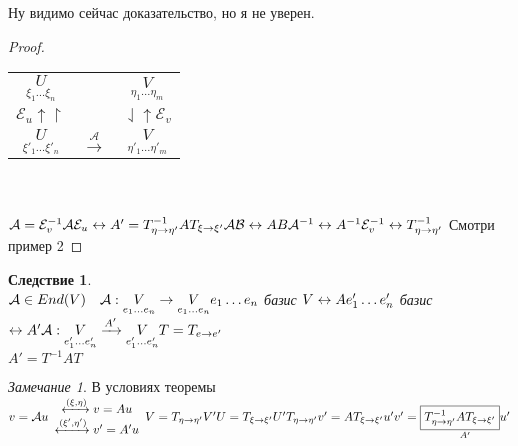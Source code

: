 \documentclass[12pt]{article}
\newtheorem{corollary}{Следствие}[theorem]
\theoremstyle{remark}
\newtheorem*{remark}{Замечание}
\theoremstyle{definition}
\newcommand{\0}{\mathbb{0}}
\newcommand{\mybox}{
	\collectbox{
		\setlength{\fboxsep}{1pt}
		\fbox{\BOXCONTENT}
	}
}
\newcommand{\E}{\mathcal{E}}
\newcommand{\A}{\mathcal{A}}
\newcommand{\B}{\mathcal{B}}
\begin{document}
	Ну видимо сейчас доказательство, но я не уверен.
	\begin{proof}\ \\
		\begin{tabular}{c c c}
 			$\underset{\xi_1\ldots\xi_n}{U}$ & \stackanchor{$\xrightarrow{\A}$}{$\rightharpoonup$} & $\underset{\eta_1\ldots\eta_m}{V}$\\
			$\E_u \uparrow \upharpoonright$ & & $\downharpoonleft \uparrow \E_v$\\
			$\underset{\xi'_1\ldots\xi'_n}{U}$ & $\xrightarrow{\A}$ & $\underset{\eta'_1\ldots\eta'_m}{V}$
		\end{tabular}
		\\\\
		$\A = \E^{-1}_v\A\E_u\leftrightarrow A' = T^{-1}_{\eta\rightarrow\eta'}AT_{\xi\rightarrow\xi'}\\
		\A\B \leftrightarrow AB\\
		\A^{-1}\leftrightarrow A^{-1}\\
		\E^{-1}_v \leftrightarrow T^{-1}_{\eta\rightarrow\eta'}$ Смотри пример 2
	\end{proof}
	\begin{corollary}
		\ \\
		$\A\in End(V) \ \ \ \A: \underset{e_1\ldots e_n}{V} \rightarrow \underset{e_1\ldots e_n}{V}\\
		e_1\ldots e_n$ базис $V \leftrightarrow A\\
		e'_1\ldots e'_n$ базис $\leftrightarrow A'\\
		\A: \underset{e'_1\ldots e'_n}{V} \xrightarrow{A'} \underset{e'_1\ldots e'_n}{V}\\
		T = T_{e\rightarrow e'}$\\
		\mybox{$A' = T^{-1}AT$}
	\end{corollary}
	\begin{remark}
		В условиях теоремы $v = \A u \begin{array}{c}
			\xleftrightarrow{(\xi, \eta)} v = Au\\
			\xleftrightarrow{(\xi', \eta')} v' = A'u
		\end{array}\\
		V = T_{\eta\rightarrow\eta'} V'\\
		U = T_{\xi\rightarrow\xi'} U'\\
		T_{\eta\rightarrow\eta'}v' = AT_{\xi\rightarrow\xi'}u'\\
		v' = \underset{A'}{\boxed{T^{-1}_{\eta\rightarrow\eta'}AT_{\xi\rightarrow\xi'}}u'}
		$
	\end{remark}
\end{document}
